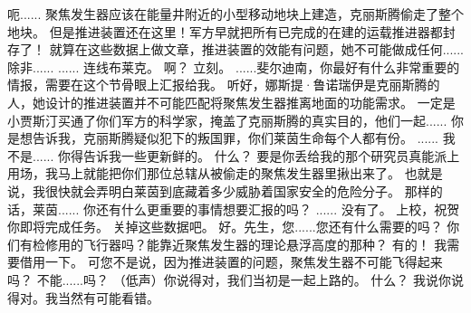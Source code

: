 \documentclass[openany]{book}
\begin{document}
\begin{dialogue}
     呃......
     聚焦发生器应该在能量井附近的小型移动地块上建造，克丽斯腾偷走了整个地块。
     但是推进装置还在这里！军方早就把所有已完成的在建的运载推进器都封存了！
     就算在这些数据上做文章，推进装置的效能有问题，她不可能做成任何......
     除非......
     ......
     连线布莱克。
     啊？
     立刻。
     ......斐尔迪南，你最好有什么非常重要的情报，需要在这个节骨眼上汇报给我。
     听好，娜斯提·鲁诺瑞伊是克丽斯腾的人，她设计的推进装置并不可能匹配将聚焦发生器推离地面的功能需求。
     一定是小贾斯汀买通了你们军方的科学家，掩盖了克丽斯腾的真实目的，他们一起......
     你是想告诉我，克丽斯腾疑似犯下的叛国罪，你们莱茵生命每个人都有份。
     ......
     我不是......
     你得告诉我一些更新鲜的。
     什么？
     要是你丢给我的那个研究员真能派上用场，我马上就能把你们那位总辖从被偷走的聚焦发生器里揪出来了。
     也就是说，我很快就会弄明白莱茵到底藏着多少威胁着国家安全的危险分子。
     那样的话，莱茵......
     你还有什么更重要的事情想要汇报的吗？
     ......
     没有了。
     上校，祝贺你即将完成任务。
     关掉这些数据吧。
     好。先生，您......您还有什么需要的吗？
     你们有检修用的飞行器吗？能靠近聚焦发生器的理论悬浮高度的那种？
     有的！
     我需要借用一下。
     可您不是说，因为推进装置的问题，聚焦发生器不可能飞得起来吗？
     不能......吗？
     （低声）你说得对，我们当初是一起上路的。
     什么？
     我说你说得对。我当然有可能看错。
\end{dialogue}
\end{document}
